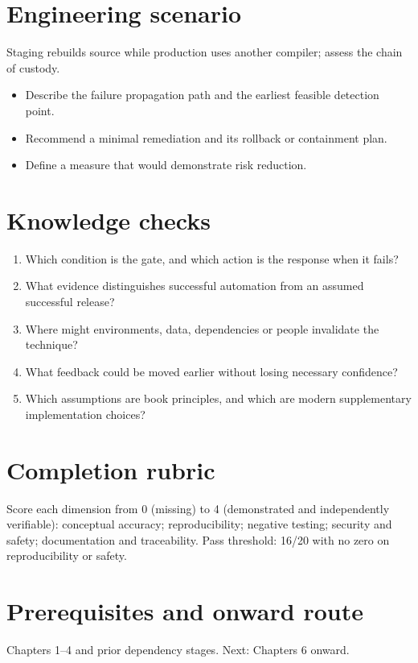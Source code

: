 \documentclass[10pt,letterpaper]{article}
\begin{document}
\section{Engineering scenario}
Staging rebuilds source while production uses another compiler; assess the chain of custody.

\begin{itemize}
\item Describe the failure propagation path and the earliest feasible detection point.
\item Recommend a minimal remediation and its rollback or containment plan.
\item Define a measure that would demonstrate risk reduction.
\end{itemize}

\section{Knowledge checks}
\begin{enumerate}
\item Which condition is the gate, and which action is the response when it fails?
\item What evidence distinguishes successful automation from an assumed successful release?
\item Where might environments, data, dependencies or people invalidate the technique?
\item What feedback could be moved earlier without losing necessary confidence?
\item Which assumptions are book principles, and which are modern supplementary implementation choices?
\end{enumerate}

\section{Completion rubric}
Score each dimension from 0 (missing) to 4 (demonstrated and independently verifiable): conceptual accuracy; reproducibility; negative testing; security and safety; documentation and traceability. Pass threshold: 16/20 with no zero on reproducibility or safety.


\section{Prerequisites and onward route}
Chapters 1--4 and prior dependency stages. Next: Chapters 6 onward.
\end{document}
